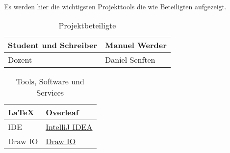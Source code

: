 Es werden hier die wichtigsten Projekttools die wie Beteiligten aufgezeigt.
\begin{table}[h!]
    \centering
    \begin{tabularx}{0.8\textwidth} {
        | >{\raggedright\arraybackslash}X
        | >{\raggedright\arraybackslash}X | }
        \hline
        \sffamily Student und Schreiber & \sffamily  Manuel Werder \\
        \hline
        \sffamily Dozent & \sffamily Daniel Senften  \\
        \hline
    \end{tabularx}
    \caption{\sffamily Projektbeteiligte}
    \label{tab:1}
\end{table}
\begin{table}[h!]
    \centering
    \begin{tabularx}{0.8\textwidth} {
        | >{\raggedright\arraybackslash}X
        | >{\raggedright\arraybackslash}X | }
        \hline
        \LaTeX & \sffamily \href{https://www.overleaf.com}{Overleaf} \\
        \hline
        \sffamily IDE & \sffamily \href{https://www.jetbrains.com/de-de/idea/}{IntelliJ IDEA}  \\
        \hline
        \sffamily Draw IO & \sffamily \href{https://drawio-app.com/}{Draw IO}  \\
        \hline
    \end{tabularx}
    \caption{\sffamily Tools, Software und Services}
    \label{tab:2}
\end{table}


